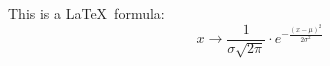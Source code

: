 \documentclass{article}
\begin{document}
\Huge
This is a \LaTeX\ formula: %
$$
x \rightarrow \frac{1}{\sigma\sqrt{2\pi}} \cdot
              e^{-\frac{(x-\mu)^2}{2\sigma^2}}
$$
\end{document}
